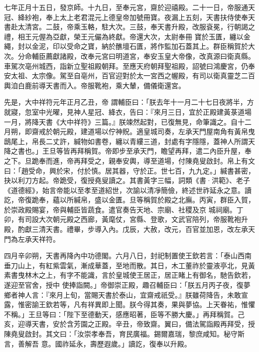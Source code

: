 \begin{pinyinscope}
 七年正月十五日，發京師。十九日，至奉元宮，齋於迎禧殿。二十一日，帝服通天冠、絳紗袍，奉上太上老君混元上德皇帝加號冊寶。夜漏上五刻，天書扶侍使奉天書赴太清宮。二鼓，帝乘玉輅，駐大次。三鼓，奉天書升殿，改服袞冕，行朝謁之禮，相王元偓為亞獻，榮王元儼為終獻。帝還大次，太尉奉冊
 寶於玉匱，纏以金繩，封以金泥，印以受命之寶，納於醮壇石匱，將作監加石蓋其上。群臣稱賀於大次。分命輔臣薦獻諸殿，改奉元宮曰明道宮，奉安玉皇大帝像，改真源曰衛真縣。車駕次亳州城西，詣新立聖祖殿朝拜。至應天府朝拜聖祖殿，詔號曰鴻慶宮，仍奉安太祖、太宗像。駕至自亳州，百官迎對於太一宮西之幄殿，有司以衛真靈芝二百輿洎白鹿前導天書而入。帝服靴袍，乘大輦，備儀衛還宮。



 先是，大中祥符元年正月乙丑，帝
 謂輔臣曰：「朕去年十一月二十七日夜將半，方就寢，忽室中光曜，見神人星冠、絳衣，告曰：『來月三日，宜於正殿建黃菉道場一月，將降天書《大中祥符》三篇。』朕竦然起對，已復無見，命筆識之。自十二月朔，即齋戒於朝元殿，建道場以佇神貺。適皇城司奏，左承天門屋南角有黃帛曳鴟尾上，帛長二丈許，緘物如書卷，纏以青縷三道，封處有字隱隱，蓋神人所謂天降之書也。」王旦等皆再拜稱賀。帝即步至承天門，瞻望再拜，遣二內臣升屋，奉
 之下。旦跪奉而進，帝再拜受之，親奉安輿，導至道場，付陳堯叟啟封。帛上有文曰：「趙受命，興於宋，付於慎。居其器，守於正。世七百，九九定。」緘書甚密，抉以利刀方起。帝跪受，復授堯叟讀之。其書黃字三幅，詞類《書·洪範》、老子《道德經》，始言帝能以至孝至道紹世，次諭以清凈簡儉，終述世祚延永之意。讀訖，帝復跪奉，蘊以所緘帛，盛以金匱。旦等稱賀於殿之北廡。丙寅，群臣入賀，於崇政殿賜宴，帝與輔臣皆蔬食。遣官奏告天地、宗廟、社稷及京
 城祠廟。丁卯，有司設大次朝元殿之西廊，黃麾仗，宮縣、登歌，文武官陪列，帝服靴袍升殿，酌獻三清天書。禮畢，步導入內。戊辰，大赦，改元，百官並加恩，改左承天門為左承天祥符。



 四月辛卯朔，天書再降內中功德閣。六月八日，封祀制置使王欽若言：「泰山西南垂刀山上，有紅紫雲氣，漸成華蓋，至地而散。其日，木工董祚於靈液亭北，見黃素書曳林木之上，有字不能識，言於皇城使王居正，居正睹上有御名，馳告欽若，遂迎至官舍，授中
 使捧詣闕。」帝御崇正殿，趣召輔臣曰：「朕五月丙子夜，復夢鄉者神人言：『來月上旬，當賜天書於泰山，宜齋戒祇受。』朕雖荷降告，未敢宣露，惟密諭王欽若等，凡有祥異即上聞。朕今得其奏，果與夢協。上天眷祐，惟懼不稱。」王旦等曰：「陛下至德動天，感應昭著，臣等不勝大慶。」再拜稱賀。己亥，迎導天書，安於含芳園之正殿。辛丑，帝致齋。翼曰，備法駕詣殿再拜受，授陳堯叟啟封。其文曰：「汝崇孝奉吾，育民廣福。錫爾嘉瑞，黎庶咸知。秘守斯言，善解吾
 意。國祚延永，壽歷遐歲。」讀訖，復奉以升殿。




\end{pinyinscope}
